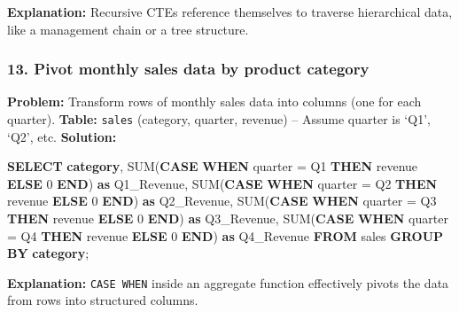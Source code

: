 \documentclass[
  11pt,
  openany,
  oneside]{book}
\newenvironment{Shaded}{}{}
\newcommand{\ControlFlowTok}[1]{\textcolor[rgb]{0.00,0.44,0.13}{\textbf{#1}}}
\newcommand{\DecValTok}[1]{\textcolor[rgb]{0.25,0.63,0.44}{#1}}
\newcommand{\FunctionTok}[1]{\textcolor[rgb]{0.02,0.16,0.49}{#1}}
\newcommand{\KeywordTok}[1]{\textcolor[rgb]{0.00,0.44,0.13}{\textbf{#1}}}
\newcommand{\NormalTok}[1]{#1}
\newcommand{\OperatorTok}[1]{\textcolor[rgb]{0.40,0.40,0.40}{#1}}
\newcommand{\StringTok}[1]{\textcolor[rgb]{0.25,0.44,0.63}{#1}}
\begin{document}
\textbf{Explanation:} Recursive CTEs reference themselves to traverse
hierarchical data, like a management chain or a tree structure.

\subsubsection{13. Pivot monthly sales data by product
category}\label{pivot-monthly-sales-data-by-product-category}

\textbf{Problem:} Transform rows of monthly sales data into columns (one
for each quarter). \textbf{Table:} \texttt{sales} (category, quarter,
revenue) -- Assume quarter is `Q1', `Q2', etc. \textbf{Solution:}

\begin{Shaded}
\begin{Highlighting}[]
\KeywordTok{SELECT} 
    \KeywordTok{category}\NormalTok{,}
    \FunctionTok{SUM}\NormalTok{(}\ControlFlowTok{CASE} \ControlFlowTok{WHEN}\NormalTok{ quarter }\OperatorTok{=} \StringTok{\textquotesingle{}Q1\textquotesingle{}} \ControlFlowTok{THEN}\NormalTok{ revenue }\ControlFlowTok{ELSE} \DecValTok{0} \ControlFlowTok{END}\NormalTok{) }\KeywordTok{as}\NormalTok{ Q1\_Revenue,}
    \FunctionTok{SUM}\NormalTok{(}\ControlFlowTok{CASE} \ControlFlowTok{WHEN}\NormalTok{ quarter }\OperatorTok{=} \StringTok{\textquotesingle{}Q2\textquotesingle{}} \ControlFlowTok{THEN}\NormalTok{ revenue }\ControlFlowTok{ELSE} \DecValTok{0} \ControlFlowTok{END}\NormalTok{) }\KeywordTok{as}\NormalTok{ Q2\_Revenue,}
    \FunctionTok{SUM}\NormalTok{(}\ControlFlowTok{CASE} \ControlFlowTok{WHEN}\NormalTok{ quarter }\OperatorTok{=} \StringTok{\textquotesingle{}Q3\textquotesingle{}} \ControlFlowTok{THEN}\NormalTok{ revenue }\ControlFlowTok{ELSE} \DecValTok{0} \ControlFlowTok{END}\NormalTok{) }\KeywordTok{as}\NormalTok{ Q3\_Revenue,}
    \FunctionTok{SUM}\NormalTok{(}\ControlFlowTok{CASE} \ControlFlowTok{WHEN}\NormalTok{ quarter }\OperatorTok{=} \StringTok{\textquotesingle{}Q4\textquotesingle{}} \ControlFlowTok{THEN}\NormalTok{ revenue }\ControlFlowTok{ELSE} \DecValTok{0} \ControlFlowTok{END}\NormalTok{) }\KeywordTok{as}\NormalTok{ Q4\_Revenue}
\KeywordTok{FROM}\NormalTok{ sales}
\KeywordTok{GROUP} \KeywordTok{BY} \KeywordTok{category}\NormalTok{;}
\end{Highlighting}
\end{Shaded}

\textbf{Explanation:} \texttt{CASE\ WHEN} inside an aggregate function
effectively pivots the data from rows into structured columns.
\end{document}
